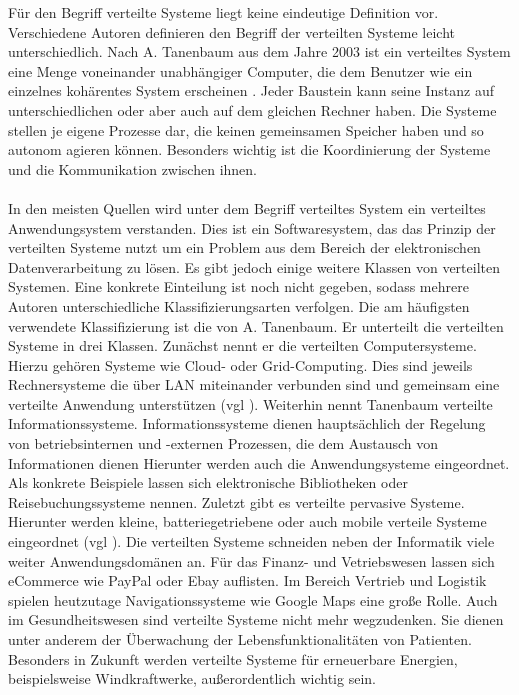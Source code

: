 \documentclass[utf8,biblatex]{lni}
\begin{document}
Für den Begriff \glqq verteilte Systeme\grqq{} liegt keine eindeutige Definition vor. Verschiedene Autoren definieren den Begriff der verteilten Systeme leicht unterschiedlich.
Nach A. Tanenbaum aus dem Jahre 2003 ist ein verteiltes System eine Menge voneinander unabhängiger Computer, die dem Benutzer wie ein einzelnes kohärentes System
erscheinen \citet{Mandl.2009}. Jeder Baustein kann seine Instanz auf unterschiedlichen oder aber auch auf dem gleichen Rechner haben. Die Systeme stellen je eigene Prozesse dar,
 die keinen gemeinsamen
Speicher haben und so autonom agieren können. Besonders wichtig ist die Koordinierung der Systeme und die Kommunikation zwischen ihnen.
\\\\
In den meisten Quellen wird unter dem Begriff verteiltes System ein verteiltes Anwendungsystem verstanden. Dies ist ein Softwaresystem, das das Prinzip der verteilten Systeme 
nutzt um ein 
Problem aus dem Bereich der elektronischen Datenverarbeitung zu lösen. Es gibt jedoch einige weitere Klassen von verteilten Systemen. Eine konkrete Einteilung ist noch nicht gegeben, sodass
mehrere Autoren unterschiedliche Klassifizierungsarten verfolgen. Die am häufigsten verwendete Klassifizierung ist die von A. Tanenbaum. Er unterteilt die verteilten Systeme
in drei Klassen. Zunächst nennt er die verteilten Computersysteme. Hierzu gehören Systeme wie Cloud- oder Grid-Computing. Dies sind jeweils Rechnersysteme die über LAN miteinander verbunden
sind und gemeinsam eine verteilte Anwendung unterstützen (vgl \citet{Mandl.2009}). Weiterhin nennt Tanenbaum verteilte Informationssysteme.
Informationssysteme dienen hauptsächlich der Regelung von betriebsinternen und -externen Prozessen, die dem Austausch von Informationen dienen \citet{Lackes.o.J.}
Hierunter werden auch die Anwendungsysteme eingeordnet. Als konkrete Beispiele lassen sich elektronische Bibliotheken oder Reisebuchungssysteme nennen.
Zuletzt gibt es verteilte pervasive Systeme. Hierunter werden kleine, batteriegetriebene oder auch mobile verteile Systeme eingeordnet (vgl \citet{Mandl.2009}).
\newline
Die verteilten Systeme schneiden neben der Informatik viele weiter Anwendungsdomänen an. Für das Finanz- und Vetriebswesen lassen sich eCommerce wie PayPal oder Ebay auflisten. 
Im Bereich Vertrieb und Logistik spielen heutzutage Navigationssysteme wie Google Maps eine große Rolle. Auch im Gesundheitswesen sind verteilte Systeme nicht mehr wegzudenken. Sie dienen unter anderem
der Überwachung der Lebensfunktionalitäten von Patienten. Besonders in Zukunft werden verteilte Systeme für erneuerbare Energien, beispielsweise Windkraftwerke, außerordentlich wichtig sein. \citet{o.V.2011}
\end{document}
